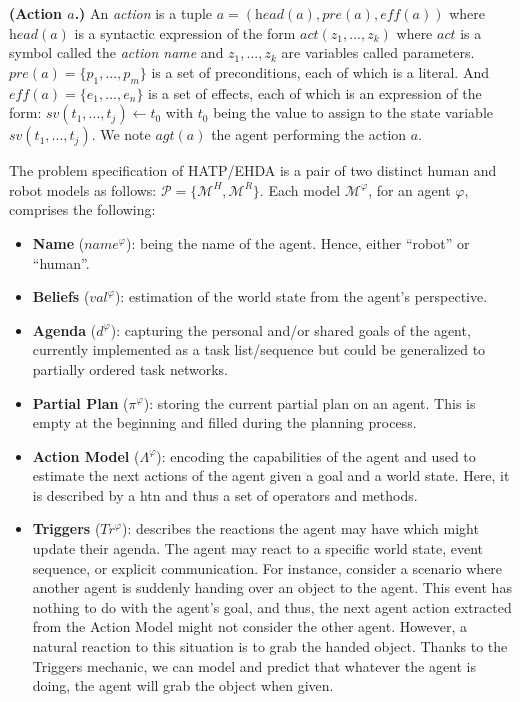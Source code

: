 \begin{definition}
    \textbf{(Action $a$.)} An \emph{action} is a tuple $a = (\textit{head}(a), \textit{pre}(a), \textit{eff}(a))$ where $\textit{head}(a)$ is a syntactic expression of the form $\textit{act}(z_1, ..., z_k)$ where $act$ is a symbol called the \emph{action name} and $z_1,...,z_k$ are variables called parameters. $\textit{pre}(a) = \{ p_1, ..., p_m \}$ is a set of preconditions, each of which is a literal. And $\textit{eff}(a) = \{ e_1, ..., e_n \}$ is a set of effects, each of which is an expression of the form: $sv(t_1, ..., t_j) \leftarrow t_0$ with $t_0$ being the value to assign to the state variable $sv(t_1, ..., t_j)$. We note $\textit{agt}(a)$ the agent performing the action $a$.
    \label{def:action}
\end{definition}


The problem specification of HATP/EHDA is a pair of two distinct human and robot models as follows: $\mathcal{P} = \{ \mathcal{M}^H, \mathcal{M}^R \}$. Each model $\mathcal{M}^\varphi$, for an agent $\varphi$, comprises the following:
\begin{itemize}
    \item \textbf{Name} ($name^{\varphi}$): being the name of the agent. Hence, either ``robot'' or ``human''.
    
    \item \textbf{Beliefs} ($val^{\varphi}$): estimation of the world state from the agent's perspective.
    
    \item \textbf{Agenda} ($d^{\varphi}$): capturing the personal and/or shared goals of the agent, currently implemented as a task list/sequence but could be generalized to partially ordered task networks.
    
    \item \textbf{Partial Plan} ($\pi^{\varphi}$): storing the current partial plan on an agent. This is empty at the beginning and filled during the planning process.
    
    \item \textbf{Action Model} ($\Lambda^{\varphi}$): encoding the capabilities of the agent and used to estimate the next actions of the agent given a goal and a world state. Here, it is described by a \acrfull{htn} and thus a set of operators and methods. 
    
    \item \textbf{Triggers} ($Tr^{\varphi}$): describes the reactions the agent may have which might update their agenda. The agent may react to a specific world state, event sequence, or explicit communication. For instance, consider a scenario where another agent is suddenly handing over an object to the agent. This event has nothing to do with the agent's goal, and thus, the next agent action extracted from the Action Model might not consider the other agent. However, a natural reaction to this situation is to grab the handed object. Thanks to the Triggers mechanic, we can model and predict that whatever the agent is doing, the agent will grab the object when given.  
\end{itemize}

